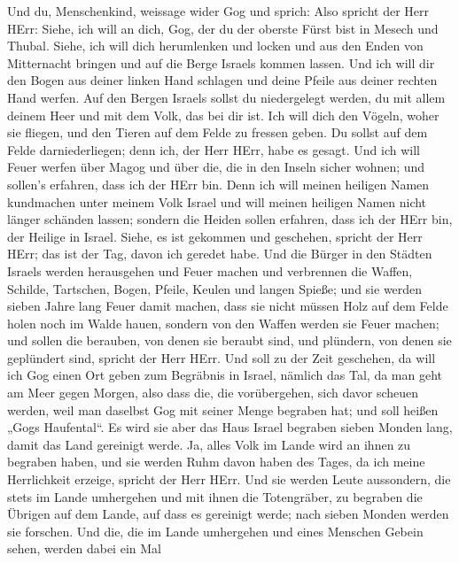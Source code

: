  Und du, Menschenkind, weissage wider Gog und sprich: Also
spricht der Herr HErr: Siehe, ich will an dich, Gog, der du der oberste
Fürst bist in Mesech und Thubal.  Siehe, ich will dich
herumlenken und locken und aus den Enden von Mitternacht bringen und auf
die Berge Israels kommen lassen.  Und ich will dir den
Bogen aus deiner linken Hand schlagen und deine Pfeile aus deiner
rechten Hand werfen.  Auf den Bergen Israels sollst du
niedergelegt werden, du mit allem deinem Heer und mit dem Volk, das bei
dir ist. Ich will dich den Vögeln, woher sie fliegen, und den Tieren auf
dem Felde zu fressen geben.  Du sollst auf dem Felde
darniederliegen; denn ich, der Herr HErr, habe es gesagt. 
Und ich will Feuer werfen über Magog und über die, die in den Inseln
sicher wohnen; und sollen's erfahren, dass ich der HErr bin.
 Denn ich will meinen heiligen Namen kundmachen unter
meinem Volk Israel und will meinen heiligen Namen nicht länger schänden
lassen; sondern die Heiden sollen erfahren, dass ich der HErr bin, der
Heilige in Israel.  Siehe, es ist gekommen und geschehen,
spricht der Herr HErr; das ist der Tag, davon ich geredet habe.
 Und die Bürger in den Städten Israels werden herausgehen
und Feuer machen und verbrennen die Waffen, Schilde, Tartschen, Bogen,
Pfeile, Keulen und langen Spieße; und sie werden sieben Jahre lang Feuer
damit machen,  dass sie nicht müssen Holz auf dem Felde
holen noch im Walde hauen, sondern von den Waffen werden sie Feuer
machen; und sollen die berauben, von denen sie beraubt sind, und
plündern, von denen sie geplündert sind, spricht der Herr HErr.
 Und soll zu der Zeit geschehen, da will ich Gog einen
Ort geben zum Begräbnis in Israel, nämlich das Tal, da man geht am Meer
gegen Morgen, also dass die, die vorübergehen, sich davor scheuen
werden, weil man daselbst Gog mit seiner Menge begraben hat; und soll
heißen „Gogs Haufental``.  Es wird sie aber das Haus
Israel begraben sieben Monden lang, damit das Land gereinigt werde.
 Ja, alles Volk im Lande wird an ihnen zu begraben haben,
und sie werden Ruhm davon haben des Tages, da ich meine Herrlichkeit
erzeige, spricht der Herr HErr.  Und sie werden Leute
aussondern, die stets im Lande umhergehen und mit ihnen die Totengräber,
zu begraben die Übrigen auf dem Lande, auf dass es gereinigt werde; nach
sieben Monden werden sie forschen.  Und die, die im Lande
umhergehen und eines Menschen Gebein sehen, werden dabei ein Mal
